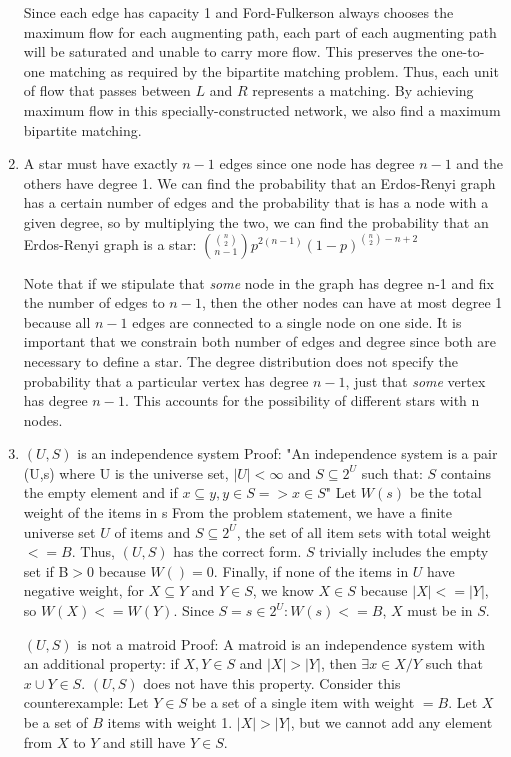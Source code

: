 \documentclass[]{article}
\begin{document}
\begin{enumerate}
	Since each edge has capacity 1 and Ford-Fulkerson always chooses the maximum flow for each augmenting path, each part of each augmenting path will be saturated and unable to carry more flow. This preserves the one-to-one matching as required by the bipartite matching problem. Thus, each unit of flow that passes between $L$ and $R$ represents a matching. By achieving maximum flow in this specially-constructed network, we also find a maximum bipartite matching. 
	
	\item A star must have exactly $n-1$ edges since one node has degree $n-1$ and the others have degree 1. We can find the probability that an Erdos-Renyi graph has a certain number of edges and the probability that is has a node with a given degree, so by multiplying the two, we can find the probability that an Erdos-Renyi graph is a star: ${{n \choose 2} \choose n-1}p^{2(n-1)}(1-p)^{{n \choose 2} - n + 2}$

	Note that if we stipulate that \textit{some} node in the graph has degree n-1 and fix the number of edges to $n-1$, then the other nodes can have at most degree 1 because all $n-1$ edges are connected to a single node on one side. It is important that we constrain both number of edges and degree since both are necessary to define a star. The degree distribution does not specify the probability that a particular vertex has degree $n-1$, just that \textit{some} vertex has degree $n-1$. This accounts for the possibility of different stars with n nodes.
	
	\item  $(U,S)$ is an independence system
	Proof:
	"An independence system is a pair (U,s) where U is the universe set, $|U| < \infty$ and $S \subseteq 2^U$ such that:
	$S$ contains the empty element and
	if $x \subseteq y, y \in S => x \in S$"\cite{cn}
	Let $W(s)$ be the total weight of the items in s
	From the problem statement, we have a finite universe set $U$ of items and $S \subseteq 2^U$, the set of all item sets with total weight $<= B$. Thus, $(U,S)$ has the correct form.
	$S$ trivially includes the empty set if B$ > 0$ because $W({})=0$.
	Finally, if none of the items in $U$ have negative weight, for $X \subseteq Y$ and $Y \in S$, we know $X \in S$ because $|X| <= |Y|$, so $W(X) <= W(Y)$. Since $S = {s \in 2^U:W(s) <= B}$, $X$ must be in $S$.
	
	$(U,S)$ is not a matroid
	Proof:
	A matroid is an independence system with an additional property: if $X,Y \in S$ and $|X| > |Y|$, then $\exists x \in X/Y$ such that ${x} \cup Y \in S$. $(U,S)$ does not have this property. Consider this counterexample: Let $Y \in S$ be a set of a single item with weight $= B$. Let $X$ be a set of $B$ items with weight 1. $|X| > |Y|$, but we cannot add any element from $X$ to $Y$ and still have $Y \in S$.
	

\end{enumerate}
\end{document}
